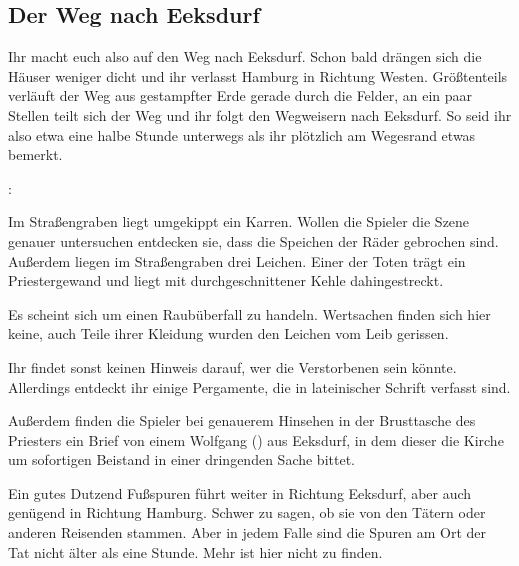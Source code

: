 
\subsection{Der Weg nach Eeksdurf}
\label{nachxd}

Ihr macht euch also auf den Weg nach Eeksdurf. Schon bald drängen sich die Häuser weniger dicht und ihr verlasst Hamburg in Richtung Westen. Größtenteils verläuft der Weg aus gestampfter Erde gerade durch die Felder, an ein paar Stellen teilt sich der Weg und ihr folgt den Wegweisern nach Eeksdurf. So seid ihr also etwa eine halbe Stunde unterwegs als ihr plötzlich am Wegesrand etwas bemerkt.

:

Im Straßengraben liegt umgekippt ein Karren. Wollen die Spieler die Szene genauer untersuchen entdecken sie, dass die Speichen der Räder gebrochen sind. Außerdem liegen im Straßengraben drei Leichen. Einer der Toten trägt ein Priestergewand und liegt mit durchgeschnittener Kehle dahingestreckt.


Es scheint sich um einen Raubüberfall zu handeln. Wertsachen finden sich hier keine, auch Teile ihrer Kleidung wurden den Leichen vom Leib gerissen.



Ihr findet sonst keinen Hinweis darauf, wer die Verstorbenen sein könnte. Allerdings entdeckt ihr einige Pergamente, die in lateinischer Schrift verfasst sind.


Außerdem finden die Spieler bei genauerem Hinsehen in der Brusttasche des Priesters ein Brief von einem Wolfgang (\blue{\ref{Wolfgang}}) aus Eeksdurf, in dem dieser die Kirche um sofortigen Beistand in einer dringenden Sache bittet.

Ein gutes Dutzend Fußspuren führt weiter in Richtung Eeksdurf, aber auch genügend in Richtung Hamburg. Schwer zu sagen, ob sie von den Tätern oder anderen Reisenden stammen. Aber in jedem Falle sind die Spuren am Ort der Tat nicht älter als eine Stunde. Mehr ist hier nicht zu finden.

